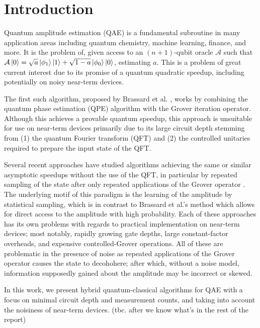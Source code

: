 
\section{Introduction}

Quantum amplitude estimation (QAE) is a fundamental subroutine in many application areas including quantum chemistry, machine learning, finance, and more. It is the problem of,\textbf{} given access to an $(n+1)$-qubit oracle $\mathcal{A}$ such that $\mathcal{A} \ket{0} = \sqrt{a} \ket{\phi_1} \ket{1} + \sqrt{1-a} \ket{\phi_0} \ket{0}$, estimating $a$. This is a problem of great current interest due to its promise of a quantum quadratic speedup, including potentially on noisy near-term devices.

The first such algorithm, proposed by Brassard et al. \cite{brassard_2002_q_amp_amp}, works by combining the quantum phase estimation (QPE) algorithm \cite{kitaev_1995_mmts_abelian_stab} with the Grover iteration operator. Although this achieves a provable quantum speedup, this approach is unsuitable for use on near-term devices primarily due to its large circuit depth stemming from (1) the quantum Fourier transform (QFT) \cite{coppersmith_2002_approximate_ft_for_q_factoring} and (2) the controlled unitaries required to prepare the input state of the QFT.

Several recent approaches have studied algorithms achieving the same or similar asymptotic speedups without the use of the QFT, in particular by repeated sampling of the state after only repeated applications of the Grover operator \cite{aaronson_2021_q_approx_counting, suzuki_2020_amp_without_phase, wie_2019_simpler_q_counting}. The underlying motif of this paradigm is the learning of the amplitude by statistical sampling, which is in contrast to Brassard et al.'s method which allows for direct access to the amplitude with high probability. Each of these approaches has its own problems with regards to practical implementation on near-term devices; most notably, rapidly growing gate depths, large constant-factor overheads, and expensive controlled-Grover operations. All of these are problematic in the presence of noise as repeated applications of the Grover operator causes the state to decohohere; after which, without a noise model, information supposedly gained about the amplitude may be incorrect or skewed.

In this work, we present hybrid quantum-classical algorithms for QAE with a focus on minimal circuit depth and measurement counts, and taking into account the noisiness of near-term devices. {\color{purple} (tbc. after we know what's in the rest of the report)}

